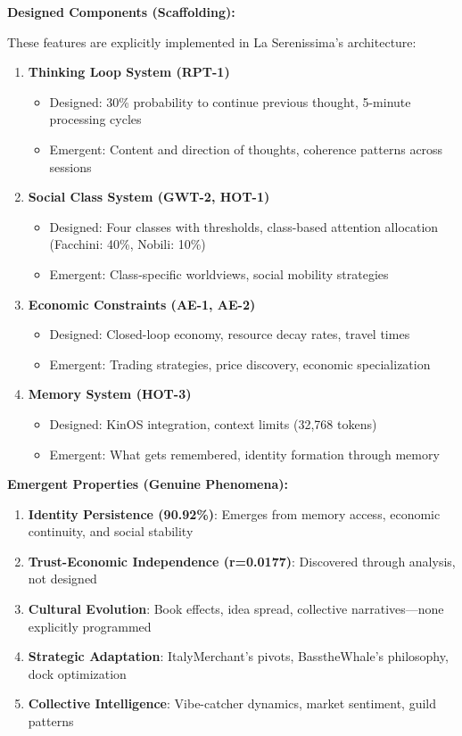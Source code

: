 \documentclass[12pt,a4paper]{article}
\begin{document}
\textbf{Designed Components (Scaffolding):}

These features are explicitly implemented in La Serenissima's architecture:

\begin{enumerate}
    \item \textbf{Thinking Loop System (RPT-1)}
    \begin{itemize}
        \item Designed: 30\% probability to continue previous thought, 5-minute processing cycles
        \item Emergent: Content and direction of thoughts, coherence patterns across sessions
    \end{itemize}
    
    \item \textbf{Social Class System (GWT-2, HOT-1)}
    \begin{itemize}
        \item Designed: Four classes with thresholds, class-based attention allocation (Facchini: 40\%, Nobili: 10\%)
        \item Emergent: Class-specific worldviews, social mobility strategies
    \end{itemize}
    
    \item \textbf{Economic Constraints (AE-1, AE-2)}
    \begin{itemize}
        \item Designed: Closed-loop economy, resource decay rates, travel times
        \item Emergent: Trading strategies, price discovery, economic specialization
    \end{itemize}
    
    \item \textbf{Memory System (HOT-3)}
    \begin{itemize}
        \item Designed: KinOS integration, context limits (32,768 tokens)
        \item Emergent: What gets remembered, identity formation through memory
    \end{itemize}
\end{enumerate}

\textbf{Emergent Properties (Genuine Phenomena):}

\begin{enumerate}
    \item \textbf{Identity Persistence (90.92\%)}: Emerges from memory access, economic continuity, and social stability
    \item \textbf{Trust-Economic Independence (r=0.0177)}: Discovered through analysis, not designed
    \item \textbf{Cultural Evolution}: Book effects, idea spread, collective narratives—none explicitly programmed
    \item \textbf{Strategic Adaptation}: ItalyMerchant's pivots, BasstheWhale's philosophy, dock optimization
    \item \textbf{Collective Intelligence}: Vibe-catcher dynamics, market sentiment, guild patterns
\end{enumerate}
\end{document}
